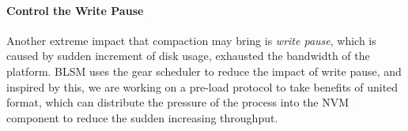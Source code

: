 \paragraph{Control the Write Pause}
Another extreme impact that compaction may bring is \textit{write pause}, which is caused by sudden increment of disk usage, exhausted the bandwidth of the platform. BLSM uses the gear scheduler to reduce the impact of write pause, and inspired by this, we are working on a pre-load protocol to take benefits of united format, which can distribute the pressure of the process into the NVM component to reduce the sudden increasing throughput.







